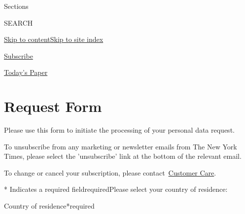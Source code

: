 Sections

SEARCH

\protect\hyperlink{site-content}{Skip to
content}\protect\hyperlink{site-index}{Skip to site index}

\href{https://www.nytimes.com/subscription/multiproduct/lp8HYKU.html?campaignId=67LWR\&return_url=}{Subscribe}\href{https://myaccount.nytimes.com/auth/login?response_type=cookie\&client_id=vi}{}

\href{https://www.nytimes.com/section/todayspaper}{Today's Paper}

\hypertarget{request-form}{%
\section{Request Form}\label{request-form}}

Please use this form to initiate the processing of your personal data
request.

To unsubscribe from any marketing or newsletter emails from The New York
Times, please select the 'unsubscribe' link at the bottom of the
relevant email.

To change or cancel your subscription, please
contact~\href{https://help.nytimes.com/hc/en-us/articles/115015385887-Contact-us\#care}{Customer
Care}.

* Indicates a required fieldrequiredPlease select your country of
residence:

Country of residence*required

